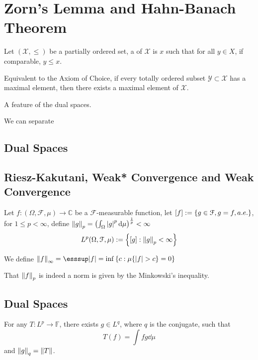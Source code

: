 \section{Zorn's Lemma and Hahn-Banach Theorem}

Let \((\mathcal{X},\leq)\) be a partially ordered set, a  of \(\mathcal{X}\) is \(x\) such that for all \(y\in X\), if comparable, \(y\leq x\). 

\begin{thm}
    Equivalent to the Axiom of Choice, if every totally ordered subset \(\mathcal{Y}\subset \mathcal{X}\) has a maximal element, then there exists a maximal element of \(\mathcal{X}\).
\end{thm}

\begin{thm}
    A feature of the dual spaces. 
\end{thm}

\begin{thm}
    We can separate
\end{thm}

\subsection{Dual Spaces}

\subsection{Riesz-Kakutani, Weak* Convergence and Weak Convergence}



Let \(f: (\Omega, \mathcal{F}, \mu) \to \mathbb{C}\) be a \(\mathcal{F}\)-measurable function, let \([f]:= \Bqty{g \in \mathcal{F}, g = f, a.e.}\), for \(1 \leq p < \infty\), define \(\norm{g}_{p} = \pqty{\int_{\Omega} \abs{g}^{p} \dd{\mu}}^{\frac{1}{p}} < \infty\)
\begin{equation*}
    L^{p}(\Omega, \mathcal{F}, \mu) := \Bqty{[g]: \norm{g}_{p} < \infty}
\end{equation*}

We define \(\norm{f}_{\infty} = \esssup \abs{f} = \inf \Bqty{c: \mu\Bqty{\abs{f}> c} = 0}\)

That \(\norm{f}_{p}\) is indeed a norm is given by the Minkowski's inequality. 

\subsection{Dual Spaces}

For any  \(T : L^{p} \to \mathbb{F}\), there exists \(g \in L^{q}\), where \(q\) is the conjugate, such that 
\begin{equation*}
    T(f) = \int fg \dd{\mu}
\end{equation*}
and \(\norm{g}_{q} = \norm{T}\).



